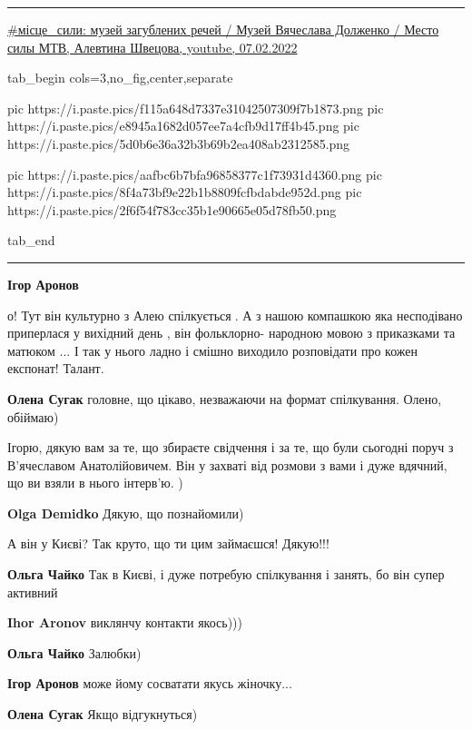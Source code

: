 \par\noindent\rule{\textwidth}{0.4pt}


\href{https://www.youtube.com/watch?v=JvcZCQV7w5M}{%
\#місце\_сили: музей загублених речей / Музей Вячеслава Долженко / Место силы МТВ, %
Алевтина Швецова, youtube, 07.02.2022%
}

\ifcmt
  tab_begin cols=3,no_fig,center,separate

	   pic https://i.paste.pics/f115a648d7337e31042507309f7b1873.png
     pic https://i.paste.pics/e8945a1682d057ee7a4cfb9d17ff4b45.png
		 pic https://i.paste.pics/5d0b6e36a32b3b69b2ea408ab2312585.png

		 pic https://i.paste.pics/aafbc6b7bfa96858377c1f73931d4360.png
		 pic https://i.paste.pics/8f4a73bf9e22b1b8809fcfbdabde952d.png
		 pic https://i.paste.pics/2f6f54f783cc35b1e90665e05d78fb50.png

  tab_end
\fi

\par\noindent\rule{\textwidth}{0.4pt}

\begin{itemize} %
\textbf{Ігор Аронов} 

о! Тут він культурно з Алею спілкується🤣. А з нашою компашкою яка несподівано
приперлася у вихідний день , він фольклорно- народною мовою з приказками та
матюком ... І так у нього ладно і смішно виходило розповідати про кожен
експонат! Талант.

\textbf{Олена Сугак} головне, що цікаво, незважаючи на формат спілкування.
Олено, обіймаю)
\end{itemize} %


Ігорю, дякую вам за те, що збираєте свідчення і за те, що були сьогодні поруч з
В'ячеславом Анатолійовичем. Він у захваті від розмови з вами і дуже вдячний, що
ви взяли в нього інтерв'ю. )

\begin{itemize} %
\textbf{Olga Demidko} Дякую, що познайомили)
\end{itemize} %


А він у Києві? Так круто, що ти цим займаєшся! Дякую!!!

\begin{itemize} %
\textbf{Ольга Чайко} Так в Києві, і дуже потребую спілкування і занять, бо він супер активний

\textbf{Ihor Aronov} виклянчу контакти якось)))

\textbf{Ольга Чайко} Залюбки)

\textbf{Ігор Аронов} може йому сосватати якусь жіночку...

\textbf{Олена Сугак} Якщо відгукнуться)

\end{itemize} %

